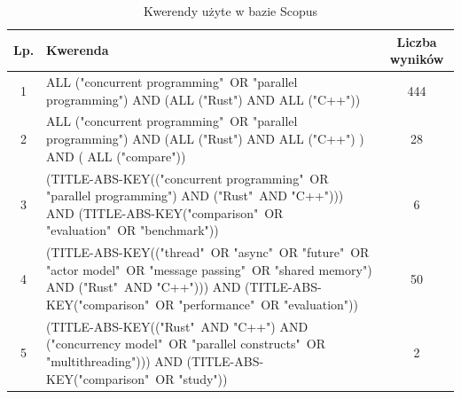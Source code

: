 \begin{table}[H]
    \caption{Kwerendy użyte w bazie Scopus \protect \footnotemark}
    \label{table:literatureReviewQueries}
    \begin{tabular}{|c|p{11cm}|c|}
    \hline
    Lp. & Kwerenda & Liczba wyników \\ \hline
    1 & ALL ("concurrent programming"\ OR "parallel programming") AND (ALL ("Rust") AND ALL ("C++")) & 444 \\ \hline

    2 & ALL ("concurrent programming"\ OR "parallel programming") AND (ALL ("Rust") AND ALL ("C++") ) AND ( ALL ("compare")) & 28 \\ \hline

    3 & (TITLE-ABS-KEY(("concurrent programming"\ OR "parallel programming") AND ("Rust"\ AND "C++"))) AND (TITLE-ABS-KEY("comparison"\ OR "evaluation"\ OR "benchmark")) & 6 \\ \hline

    4 & (TITLE-ABS-KEY(("thread"\ OR "async"\ OR "future"\ OR "actor model"\ OR "message passing"\ OR "shared memory") AND ("Rust"\ AND "C++"))) AND (TITLE-ABS-KEY("comparison"\ OR "performance"\ OR "evaluation")) & 50 \\ \hline

    5 & (TITLE-ABS-KEY(("Rust"\ AND "C++") AND ("concurrency model"\ OR "parallel constructs"\ OR "multithreading"))) AND (TITLE-ABS-KEY("comparison"\ OR "study")) & 2 \\ \hline

    \end{tabular}
\end{table}

